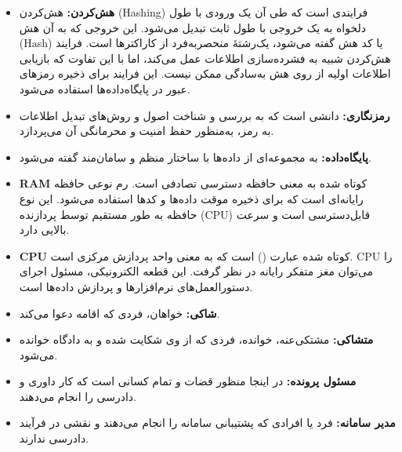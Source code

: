 \documentclass[12pt,a4paper,oneside]{article}
\begin{document}
\begin{itemize}
						  \item 
						  \textbf{هش‌کردن:\label{ref:hash}}
						   هش‌کردن (Hashing) فرایندی است که طی آن یک ورودی با طول دلخواه به یک خروجی با طول ثابت تبدیل می‌شود. این خروجی که به آن هش (Hash) یا کد هش  گفته می‌شود، یک‌رشتهٔ منحصربه‌فرد از کاراکترها است. فرایند هش‌کردن شبیه به فشرده‌سازی اطلاعات عمل می‌کند، اما با این تفاوت که بازیابی اطلاعات اولیه از روی هش به‌سادگی ممکن نیست. این فرایند برای ذخیره رمزهای عبور در پایگاه‌داده‌ها استفاده می‌شود.
				
						   \item
						   \textbf{رمزنگاری:\label{ref:encryption}}
							دانشی است که به بررسی و شناخت اصول و روش‌های تبدیل اطلاعات به رمز، به‌منظور حفظ امنیت و محرمانگی آن می‌پردازد.
							 				 
							\item 
							\textbf{پایگاه‌داده:\label{ref:database}}
							به مجموعه‌ای از داده‌ها با ساختار منظم و سامان‌مند گفته می‌شود.

							\item 
							\textbf{RAM\rl{:}\label{ref:ram}}
							کوتاه شده
							 به معنی حافظه دسترسی تصادفی است. رم نوعی حافظه رایانه‌ای است که برای ذخیره موقت داده‌ها و کدها استفاده می‌شود. این نوع حافظه به طور مستقیم توسط پردازنده (CPU) قابل‌دسترسی است و سرعت بالایی دارد.
							 
							 \item
							\textbf{CPU\rl{:}\label{ref:cpu}}
							کوتاه شده عبارت
							 ()
							  است که به معنی واحد پردازش مرکزی است. CPU را می‌توان مغز متفکر رایانه در نظر گرفت. این قطعه الکترونیکی، مسئول اجرای دستورالعمل‌های نرم‌افزارها و پردازش داده‌ها است.	
							  
							  \item 
								\textbf{شاکی:\label{ref:complainant}} 
								خواهان، فردی که اقامه دعوا می‌کند.
								
								\item 
								\textbf{متشاکی:\label{ref:defendant}} 
								مشتکی‌عنه، خوانده، فردی که از وی شکایت شده و به دادگاه خوانده می‌شود.
								
								\item 
								\textbf{مسئول پرونده:\label{ref:caseofficer}} 
								در اینجا منظور قضات و تمام کسانی است که کار داوری و دادرسی را انجام می‌دهند.
								
								\item 
								\textbf{مدیر سامانه:\label{ref:admin}} 
								فرد یا افرادی که پشتیبانی سامانه را انجام می‌دهند و نقشی در فرآیند دادرسی ندارند.
														

			\end{itemize}
		
\end{document}
